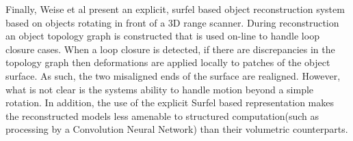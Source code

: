 Finally, Weise et al present an explicit, surfel based object reconstruction system\cite{Weise2009} based on objects rotating in front of a 3D 
range scanner. During reconstruction an object topology graph is constructed that is used on-line to handle loop closure cases. When a loop 
closure is detected, if there are discrepancies in the topology graph then deformations are applied locally to patches of the object surface. As 
such, the two misaligned ends of the surface are realigned. However, what is not clear is the systems ability to handle motion beyond a simple 
rotation.  In addition, the use of the explicit Surfel based representation makes the reconstructed models less amenable to structured  computation(such as processing by a Convolution Neural Network) than their volumetric counterparts. 